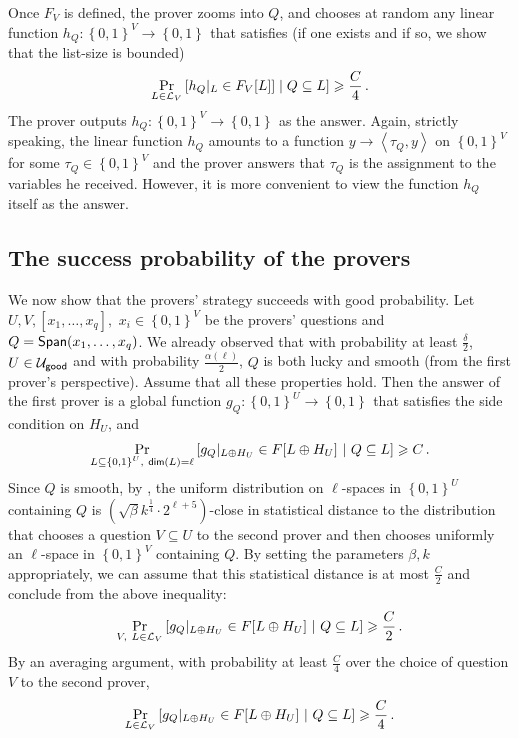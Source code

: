 \documentclass{toc}
\newcommand\set[1]{{\left\{ #1 \right\}}}
\newcommand\Prob[2]{{\Pr_{#1}\left[ {#2} \right]}}
\newcommand\power[1]{\set{0,1}^{#1}}
\newcommand*\xor{\mathbin{\oplus}}
\begin{document}
Once $F_{V}$ is defined, the prover zooms into $Q$,
 and chooses at random any linear function
$h_Q\colon \power{V}\to\power{}$ that satisfies (if one exists and if so, we show that the list-size is bounded)
\begin{equation} \label{eqn:prover2-strat}
\Prob{L \in {\cal L}_V}{h_Q|_{L} \in F_V[L]] \mid Q \subseteq L}\geqslant \frac{C}{4}\,.%
\end{equation}
The prover outputs $h_Q: \power{V} \to \power{}$ as the answer. Again, strictly speaking,
 the linear function $h_Q$  amounts to a function
$y \to \left< \tau_Q, y\right> $ on $\power{V}$ for some $\tau_Q \in \power{V}$ and the prover answers that $\tau_Q$ is the
assignment to the  variables he received. However, it
is more convenient to view the function $h_Q$ itself as the answer.

\subsection{The success probability of the provers}
We now show that the provers' strategy succeeds with good probability.  Let
%
%
 $U, V, [x_1,\ldots, x_q],$ $x_i \in \power{V}$  %
be the provers' questions and $Q = {\sf Span}(x_1,\ldots, x_q)$.
We already observed that with probability
at least $\frac{\delta}{2}$,
 $U \in {\cal U}_{\sf good} $ and with probability $\frac{\alpha(\ell)}{2}$, $Q$ is both lucky and smooth (from the first
prover's perspective). Assume that all these properties hold. Then the answer of the first prover is a global function
$g_Q : \power{U} \to \power{}$ that satisfies the side condition on $H_U$, and
\[
  \Prob{L \subseteq \power{U}, ~{\sf dim}(L)=\ell}{g_Q|_{L\xor H_U}  \in F[L\xor H_U]  ~|  ~Q \subseteq L}\geqslant C\,.%
\]
Since $Q$ is smooth, by , the uniform distribution on $\ell$-spaces in $\power{U}$ containing $Q$ is $(\sqrt{\beta} k^{\frac{1}{4}}\cdot 2^{\ell+5})$-close in statistical distance
to the distribution that chooses a question $V \subseteq U$ to the second prover and then chooses uniformly an $\ell$-space in $\power{V}$ containing $Q$. By setting the
parameters $\beta, k$ appropriately, we can assume that this statistical distance is at most $\frac{C}{2}$ and
conclude from the above inequality:
\[
  \Prob{V, ~L \in {\cal L}_V}{g_Q|_{L\xor H_U}  \in F[L\xor H_U]  ~|  ~Q \subseteq L}\geqslant \frac{C}{2}\,.%
\]
By an averaging argument, with probability at least $\frac{C}{4}$ over the choice of question $V$ to the second prover,
\[
  \Prob{L \in {\cal L}_V}{g_Q|_{L\xor H_U}  \in F[L\xor H_U]  ~|  ~Q \subseteq L}\geqslant \frac{C}{4}\,.%
\]
\end{document}
